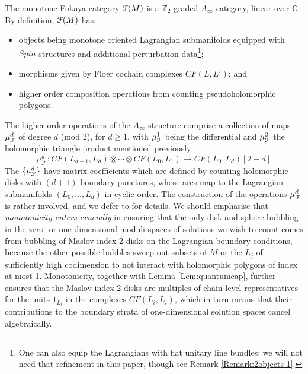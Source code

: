 \documentclass[reqno,10pt]{amsart}
\numberwithin{equation}{section}
\newcommand{\bC}{{\mathbb C}}
\newcommand{\bZ}{{\mathbb Z}}
\newcommand{\scrF}{\EuScript{F}}
\newcommand{\sF}{{\mathscr F}}
\theoremstyle{remark}
\begin{document}
The monotone Fukaya category $\scrF(M)$ is a $\bZ_2$-graded $A_{\infty}$-category, linear over $\bC$.  By definition, $\scrF(M)$ has:
\begin{itemize}
\item objects being monotone oriented Lagrangian submanifolds equipped with $Spin$ structures  and additional perturbation data\footnote{One can also equip the Lagrangians with flat unitary line bundles; we will not need that refinement in this paper, though see Remark \ref{Remark:2objects-1}.};
\item morphisms given by Floer cochain complexes $CF(L,L')$; and
\item higher order composition operations from counting pseudoholomorphic polygons.
\end{itemize}
The higher order operations of the $A_{\infty}$-structure comprise a collection of maps $\mu_{\scrF}^d$ of degree $d$ (mod 2), for $d\geq 1$, with $\mu_{\scrF}^1$ being the differential and $\mu_{\scrF}^2$ the holomorphic triangle product mentioned previously:
\[
\mu_{\sF}^d: CF(L_{d-1},L_d) \otimes \cdots \otimes CF(L_0,L_1) \rightarrow CF(L_0,L_d)[2-d]
\]
The $\{\mu^d_{\scrF}\}$ have matrix coefficients which are defined by counting holomorphic disks with $(d+1)$-boundary punctures, whose arcs map to the Lagrangian submanifolds $(L_0,\ldots, L_d)$ in cyclic order.   The construction of the operations $\mu^d_{\scrF}$ is rather involved, and we  defer to \cite{FCPLT} for details.  We should emphasise that  \emph{monotonicity enters crucially} in ensuring that the only disk and sphere bubbling in the zero- or one-dimensional moduli spaces of solutions we wish to count comes from bubbling of Maslov index 2 disks on the Lagrangian boundary conditions,  because the other possible bubbles sweep out subsets of $M$ or the $L_j$ of sufficiently high codimension to not interact with holomorphic polygons of index at most 1.   Monotonicity, together with Lemma \ref{Lem:quantumcap}, further ensures that the Maslov index 2 disks are multiples of chain-level representatives for the units $1_{L_i}$ in the complexes $CF(L_i, L_i)$, which in turn means that their contributions to the boundary strata of one-dimensional solution spaces cancel algebraically.   
\end{document}
